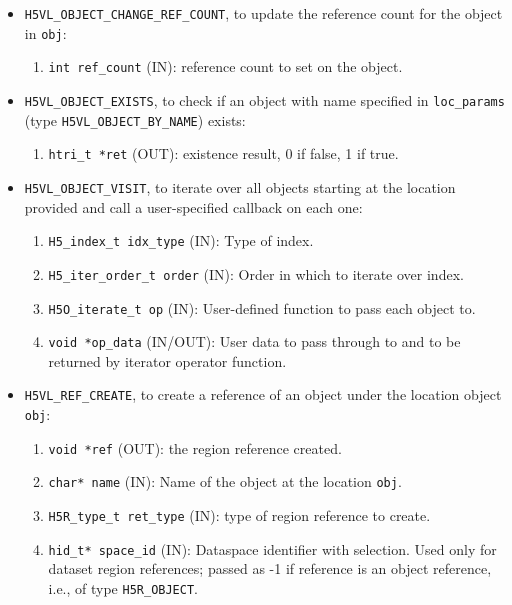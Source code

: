 \begin{itemize}
\item \texttt{H5VL\_OBJECT\_CHANGE\_REF\_COUNT}, to update the reference
  count for the object in \texttt{obj}:
  \begin{enumerate}
  \item \texttt{int ref\_count} (IN): reference count to set on the object.
  \end{enumerate}

\item \texttt{H5VL\_OBJECT\_EXISTS}, to check if an object with name
  specified in \texttt{loc\_params} (type \texttt{H5VL\_OBJECT\_BY\_NAME})
  exists:
  \begin{enumerate}
  \item \texttt{htri\_t *ret} (OUT): existence result, 0 if false, 1 if true.
  \end{enumerate}

\item \texttt{H5VL\_OBJECT\_VISIT}, to iterate over all objects starting at the location provided and call a user-specified callback on each one:
  \begin{enumerate}
  \item \texttt{H5\_index\_t idx\_type} (IN): Type of index.\\
  \item \texttt{H5\_iter\_order\_t order} (IN): Order in which to iterate over index.\\
  \item \texttt{H5O\_iterate\_t op} (IN): User-defined function to pass each object to. \\
  \item \texttt{void *op\_data} (IN/OUT): User data to pass through to and to be returned by iterator operator function. \\
  \end{enumerate}
  
\item \texttt{H5VL\_REF\_CREATE}, to create a reference of an object
  under the location object \texttt{obj}:
  \begin{enumerate}
  \item \texttt{void *ref} (OUT): the region reference created.
  \item \texttt{char* name} (IN): Name of the object at the location \texttt{obj}.
  \item \texttt{H5R\_type\_t ret\_type} (IN): type of region reference to
    create.
  \item \texttt{hid\_t* space\_id} (IN): Dataspace identifier with
    selection. Used only for dataset region references; passed as -1 if
    reference is an object reference, i.e., of type \texttt{H5R\_OBJECT}.
  \end{enumerate}
\end{itemize}

